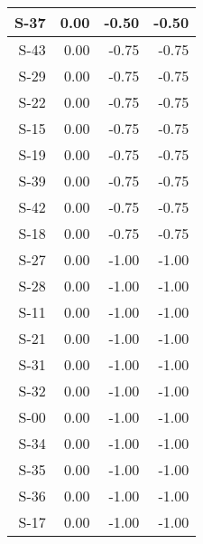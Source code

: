 \begin{tabular}{ | r | r | r | r | }
    \hline
                  S-37  &            0.00  &           -0.50  &           -0.50  \\
    \hline
                  S-43  &            0.00  &           -0.75  &           -0.75  \\
    \hline
                  S-29  &            0.00  &           -0.75  &           -0.75  \\
    \hline
                  S-22  &            0.00  &           -0.75  &           -0.75  \\
    \hline
                  S-15  &            0.00  &           -0.75  &           -0.75  \\
    \hline
                  S-19  &            0.00  &           -0.75  &           -0.75  \\
    \hline
                  S-39  &            0.00  &           -0.75  &           -0.75  \\
    \hline
                  S-42  &            0.00  &           -0.75  &           -0.75  \\
    \hline
                  S-18  &            0.00  &           -0.75  &           -0.75  \\
    \hline
                  S-27  &            0.00  &           -1.00  &           -1.00  \\
    \hline
                  S-28  &            0.00  &           -1.00  &           -1.00  \\
    \hline
                  S-11  &            0.00  &           -1.00  &           -1.00  \\
    \hline
                  S-21  &            0.00  &           -1.00  &           -1.00  \\
    \hline
                  S-31  &            0.00  &           -1.00  &           -1.00  \\
    \hline
                  S-32  &            0.00  &           -1.00  &           -1.00  \\
    \hline
                  S-00  &            0.00  &           -1.00  &           -1.00  \\
    \hline
                  S-34  &            0.00  &           -1.00  &           -1.00  \\
    \hline
                  S-35  &            0.00  &           -1.00  &           -1.00  \\
    \hline
                  S-36  &            0.00  &           -1.00  &           -1.00  \\
    \hline
                  S-17  &            0.00  &           -1.00  &           -1.00  \\

\end{tabular}
